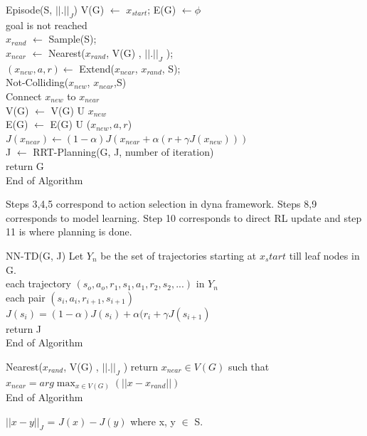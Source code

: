\documentclass[MTech]{iitmdiss}
\begin{document}
\begin{algorithm}{Episode(S, $|| . ||_J$)}{
\label{algo:Dyna-Episode}
}
 V(G) $\leftarrow$ {$x_{start}$};  E(G) $\leftarrow${$\phi$ } \\
\qwhile goal is not reached \\
$x_{rand}$ $\leftarrow$ Sample(S);\\
$x_{near}$ $\leftarrow$ Nearest($x_{rand}$, V(G) , $|| . ||_J $ );\\
$(x_{new}, a, r) \leftarrow$ Extend($x_{near}$, $x_{rand}$, S);\\
\qif Not-Colliding($x_{new}$, $x_{near}$,S)\\
\qthen Connect $x_{new}$ to $x_{near}$\\
V(G) $\leftarrow$ V(G) U {$ x_{new}$ }\\
E(G) $\leftarrow$ E(G) U ($x_{new}, a, r$)\\
$J(x_{near}) \leftarrow (1 - \alpha) J (x_{near} + \alpha (r + \gamma J(x_{new})))$ \qfi\\
J $\leftarrow$ RRT-Planning(G, J, number of iteration)\qend\\
return G\\
End of Algorithm
\end{algorithm}
Steps 3,4,5 correspond to action selection in dyna framework. Steps 8,9 corresponds to model learning. Step 10 corresponds to direct RL update and step 11 is where planning is done. 

\begin{algorithm}{NN-TD(G, J)}{
\label{algo:NN-TD}
}
Let $Y_n$ be the set of trajectories starting at $x_start$ till leaf nodes in G.\\
\qfor each trajectory $(s_o, a_o, r_1, s_1, a_1, r_2, s_2, ...)$ in $Y_n$\\
\qfor each pair $(s_i,a_i,r_{i+1}, s_{i+1})$\\
$J(s_i) = (1 - \alpha) J(s_i) + \alpha(r_i + \gamma J(s_{i+1})$\qrof\qrof\\
return J\\
End of Algorithm
\end{algorithm}


\begin{algorithm}{Nearest($x_{rand}$, V(G) , $|| . ||_J$ )}{
\label{algo:Nearest}
}
return $x_{near} \in V(G)$ such that  $x_{near} = \displaystyle arg\max_{x \in V(G)} (|| x - x_{rand}|| ) $\\
End of Algorithm
\end{algorithm}
$||x - y||_J$ = $J(x) - J(y)$ where x, y $\in$ S.
 
\end{document}
